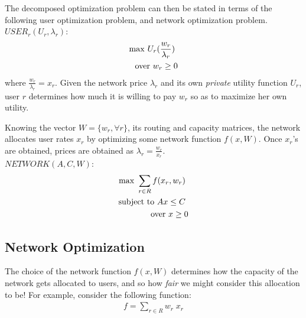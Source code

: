 \documentclass{article}
\begin{document}
The decomposed optimization problem can then be stated in terms of the following user optimization problem, and network optimization problem. \\

$USER_r(U_r, \lambda_r):$
\begin{eqnarray*}
{\rm max}\ U_r(\frac{w_r}{\lambda_r}) \ \\
{\rm over}\ w_r \geq 0 
\end{eqnarray*}
where $\frac{w_r}{\lambda_r} = x_r $. Given the network price $\lambda_r$ and its own {\em private} utility function $U_r$, user $r$ determines how much it is willing to pay $w_r$ so as to maximize her own utility.

Knowing the vector $W=\{ w_r, \forall r \}$, its routing and capacity matrices, the network allocates user rates $x_r$ by optimizing some network function $f(x,W)$. Once $x_r$'s are obtained, 
prices are obtained as $\lambda_r = \frac{w_r}{x_r}$.\\

$NETWORK(A, C, W):$
\begin{eqnarray*}
{\rm max}\ \sum_{r \in R} f(x_r, w_r) \ \\
{\rm subject~to}\ A x \leq C \ \\
{\rm over}\ x \geq 0
\end{eqnarray*}

\subsection{Network Optimization}

The choice of the network function $f(x,W)$ determines how the capacity of the network gets allocated to users, and so how {\em fair} we might consider this allocation to be! For example, consider the following function:
\begin{eqnarray*}
f = \sum_{r \in R} w_r\; x_r
\end{eqnarray*}
\end{document}
